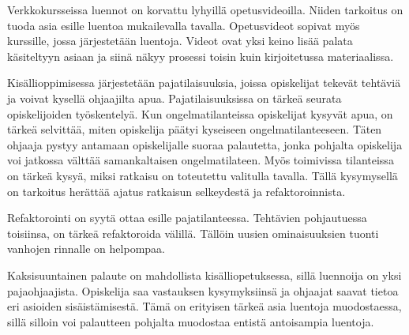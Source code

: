 Verkkokursseissa luennot on korvattu lyhyillä opetusvideoilla. Niiden tarkoitus
on tuoda asia esille luentoa mukailevalla tavalla. Opetusvideot sopivat myös
kurssille, jossa järjestetään luentoja. Videot ovat yksi keino lisää palata
käsiteltyyn asiaan ja siinä näkyy prosessi toisin kuin kirjoitetussa
materiaalissa.

Kisällioppimisessa järjestetään pajatilaisuuksia, joissa opiskelijat tekevät
tehtäviä ja voivat kysellä ohjaajilta apua. Pajatilaisuuksissa on tärkeä seurata
opiskelijoiden työskentelyä. Kun ongelmatilanteissa opiskelijat kysyvät apua, on
tärkeä selvittää, miten opiskelija päätyi kyseiseen ongelmatilanteeseen. Täten
ohjaaja pystyy antamaan opiskelijalle suoraa palautetta, jonka pohjalta
opiskelija voi jatkossa välttää samankaltaisen ongelmatilateen. Myös toimivissa
tilanteissa on tärkeä kysyä, miksi ratkaisu on toteutettu valitulla tavalla.
Tällä kysymysellä on tarkoitus herättää ajatus ratkaisun selkeydestä ja
refaktoroinnista.

Refaktorointi on syytä ottaa esille pajatilanteessa. Tehtävien pohjautuessa
toisiinsa, on tärkeä refaktoroida välillä. Tällöin uusien ominaisuuksien tuonti
vanhojen rinnalle on helpompaa.

Kaksisuuntainen palaute on mahdollista kisälliopetuksessa, sillä luennoija on
yksi pajaohjaajista. Opiskelija saa vastauksen kysymyksiinsä ja ohjaajat saavat
tietoa eri asioiden sisäistämisestä. Tämä on erityisen tärkeä asia luentoja
muodostaessa, sillä silloin voi palautteen pohjalta muodostaa entistä
antoisampia luentoja.
